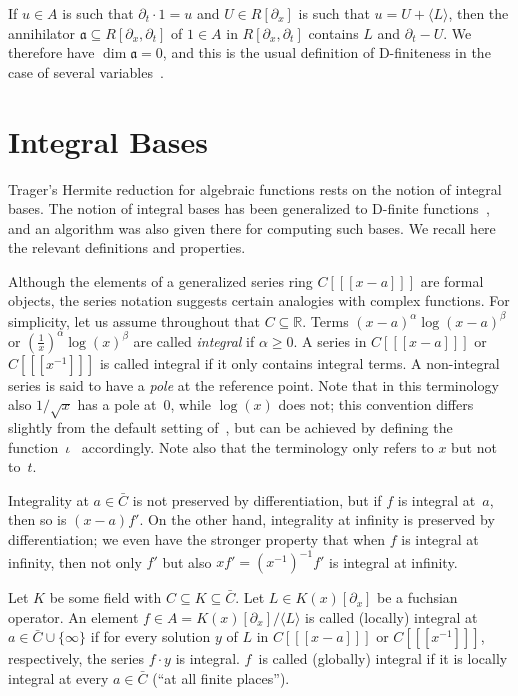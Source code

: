 \documentclass[final,1p,times,authoryear]{elsarticle}
\def\<#1>{\langle#1\rangle}
\let\set\mathbb
\begin{document}
If $u\in A$ is such that $\partial_t\cdot 1 = u$ and $U\in R[\partial_x]$ is such
that $u=U+\<L>$, then the annihilator $\mathfrak{a}\subseteq R[\partial_x,\partial_t]$
of $1\in A$ in $R[\partial_x,\partial_t]$ contains $L$ and $\partial_t-U$. We
therefore have $\dim\mathfrak{a}=0$, and this is the usual
definition of D-finiteness in the case of several variables~\citep{Zeilberger1990,chyzak98,koutschan09,kauers14c}.

\section{Integral Bases}

Trager's Hermite reduction for algebraic functions rests on the notion of
integral bases. The notion of integral bases has been generalized to D-finite
functions~\citep{kauers15b}, and an algorithm was also given there for
computing such bases. We recall here the relevant definitions and properties.

Although the elements of a generalized series ring $C[[[x-a]]]$ are formal
objects, the series notation suggests certain analogies with complex
functions.  For simplicity, let us assume throughout that $C\subseteq\set
R$. Terms $(x-a)^\alpha\log(x-a)^\beta$ or $(\tfrac1x)^\alpha\log(x)^\beta$ are
called \emph{integral} if $\alpha\geq0$. A series in
$C[[[x-a]]]$ or $C[[[x^{-1}]]]$ is called integral if it only contains integral
terms. A non-integral series is said to have a \emph{pole} at the reference
point. Note that in this terminology also $1/\sqrt{x}$ has a pole
at~$0$, while $\log(x)$ does not; this convention differs slightly from the
default setting of~\citep[Ex.~2]{kauers15b}, but can be achieved by defining
the function~$\iota$~\citep[Def.~1]{kauers15b} accordingly. Note also that
the terminology only refers to $x$ but not to~$t$.

Integrality at $a\in\bar C$ is not preserved by differentiation,
but if $f$ is integral at~$a$, then so is $(x-a)f'$. On the other hand,
integrality at infinity is preserved by differentiation; we even have the
stronger property that when $f$ is integral at infinity, then not only $f'$
but also $xf'=(x^{-1})^{-1}f'$ is integral at infinity.

Let $K$ be some field with $C\subseteq K\subseteq\bar C$.
Let $L\in K(x)[\partial_x]$ be a fuchsian operator. An element $f\in A=K(x)[\partial_x]/\<L>$
is called (locally) integral at $a\in\bar C\cup\{\infty\}$ if for every solution $y$
of $L$ in $C[[[x-a]]]$ or $C[[[x^{-1}]]]$, respectively, the series $f\cdot y$ is
integral. $f$~is called (globally) integral if it is locally integral at every
$a\in\bar C$ (``at all finite places'').
\end{document}

